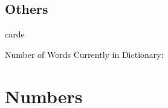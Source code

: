 \begin{multicols*}{2}
\section{Others}

\begin{description}[leftmargin=*, labelwidth=*]
    \begin{dictentry}{carde}{}
    \end{dictentry}
\end{description}
\vspace*{\fill}
Number of Words Currently in Dictionary: \thedictwordcount
\end{multicols*}

\newpage

\section{Numbers}

